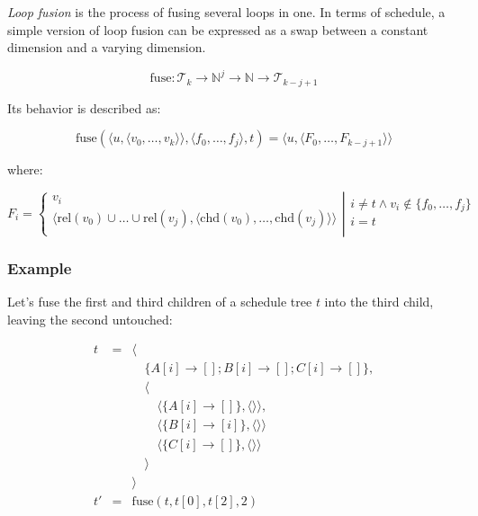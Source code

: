 \documentclass{article}
\begin{document}
\emph{Loop fusion} is the process of fusing several loops in one. In terms of
schedule, a simple version of loop fusion can be expressed as a swap between a
constant dimension and a varying dimension.

\[
    \mathrm{fuse}:  \mathcal{T}_k \rightarrow  \mathbb{N}^j \rightarrow \mathbb{N} \rightarrow  \mathcal{T}_{k - j + 1}
\]

Its behavior is described as: 

\[
    \mathrm{fuse}(\langle u, \langle v_0, \ldots, v_k\rangle \rangle, \langle f_0, \ldots, f_j\rangle, t) = \langle  u, \langle F_0, \ldots, F_{k-j+1}\rangle \rangle
\]

\noindent where:

\[
    F_i = \left\{
    \begin{array}{c}
         v_i \\
        \langle \mathrm{rel}(v_0) \cup \ldots \cup \mathrm{rel}(v_j), \langle \mathrm{chd}(v_0), \ldots, \mathrm{chd}(v_j)\rangle  \rangle  \\
    \end{array}
    \right|
    \left.
    \begin{array}{l}
         i \neq t \wedge  v_i \not\in \{f_0, \ldots, f_j\} \\
         i = t \\
    \end{array}
    \right.
\]

\subsubsection*{Example}

Let's fuse the first and third children of a schedule tree $t$ into the third child, leaving the second untouched:

\[
    \begin{array}{lcl}
        t &=& \langle \\
          & & \quad\{A[i] \rightarrow []; B[i] \rightarrow []; C[i] \rightarrow []  \},\\
          & & \quad\langle \\
          & & \quad\quad \langle\{ A[i] \rightarrow [] \}, \langle\rangle\rangle,\\
          & & \quad\quad \langle\{ B[i] \rightarrow [i] \}, \langle\rangle\rangle\\
          & & \quad\quad \langle\{ C[i] \rightarrow [] \}, \langle\rangle\rangle\\
          & & \quad\rangle \\
          & & \rangle \\
        t'&=& \mathrm{fuse}(t, t[0], t[2], 2) \\
    \end{array}
\]
\end{document}

